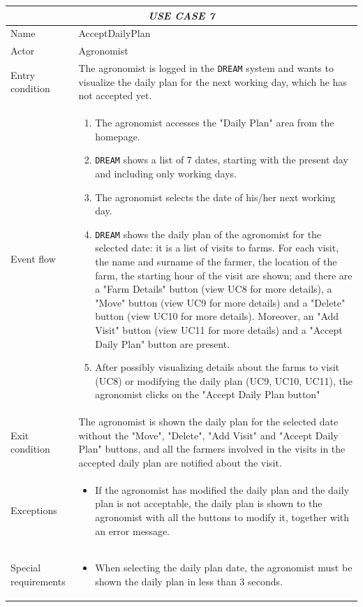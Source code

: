 \documentclass{article}
\begin{document}
\centering
\begin{longtable}{|p{3.5cm}|m{8cm}|}
 \hline
 \multicolumn{2}{|c|}{\cellcolor{white}\emph{USE CASE 7}} \\
 \endfirsthead
 \endhead
 \endfoot
 \endlastfoot
 \hline
 Name & AcceptDailyPlan\\
 \hline
 Actor & Agronomist\\
 \hline
 Entry condition & The agronomist is logged in the \verb|DREAM| system and wants to visualize the daily plan for the next working day, which he has not accepted yet.\\
 \hline
 Event flow & \begin{enumerate}
    \item The agronomist accesses the "Daily Plan" area from the homepage.
    \item \verb|DREAM| shows a list of 7 dates, starting with the present day and including only working days.
    \item The agronomist selects the date of his/her next working day.
    \item \verb|DREAM| shows the daily plan of the agronomist for the selected date: it is a list of visits to farms. For each visit, the name and surname of the farmer, the location of the farm, the starting hour of the visit are shown; and there are a "Farm Details" button (view UC8 for more details), a "Move" button (view UC9 for more details) and a "Delete" button (view UC10 for more details). Moreover, an "Add Visit" button (view UC11 for more details) and a "Accept Daily Plan" button are present.
    \item After possibly visualizing details about the farms to visit (UC8) or modifying the daily plan (UC9, UC10, UC11), the agronomist clicks on the "Accept Daily Plan button"
 \end{enumerate}\\
 \hline
 Exit condition & The agronomist is shown the daily plan for the selected date without the "Move", "Delete", "Add Visit" and "Accept Daily Plan" buttons, and all the farmers involved in the visits in the accepted daily plan are notified about the visit.\\
 \hline
 Exceptions & \begin{itemize}
     \item If the agronomist has modified the daily plan and the daily plan is not acceptable, the daily plan is shown to the agronomist with all the buttons to modify it, together with an error message.
 \end{itemize}\\
 \hline
 Special requirements &\begin{itemize}
     \item When selecting the daily plan date, the agronomist must be shown the daily plan in less than 3 seconds.
 \end{itemize}\\
 \hline
\end{longtable}
\end{document}
